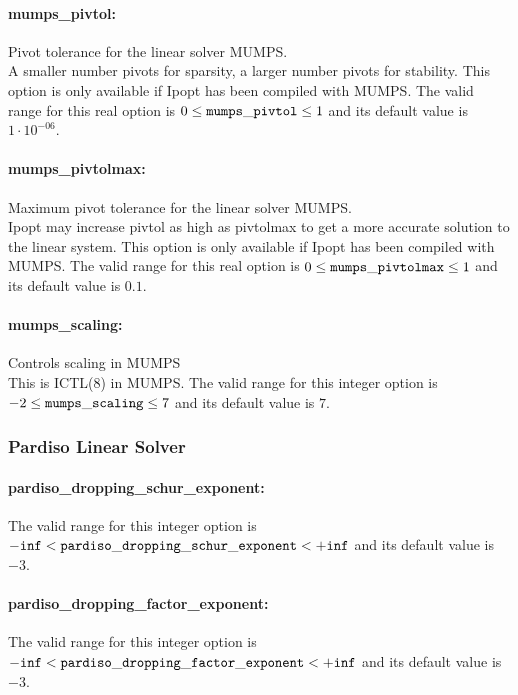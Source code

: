 \paragraph{mumps\_pivtol:}\label{sec:mumps_pivtol} Pivot tolerance for the linear solver MUMPS. $\;$ \\
 A smaller number pivots for sparsity, a larger
number pivots for stability.  This option is only
available if Ipopt has been compiled with MUMPS. The valid range for this real option is 
$0 \le {\tt mumps\_pivtol } \le 1$
and its default value is $1 \cdot 10^{-06}$.


\paragraph{mumps\_pivtolmax:}\label{sec:mumps_pivtolmax} Maximum pivot tolerance for the linear solver MUMPS. $\;$ \\
 Ipopt may increase pivtol as high as pivtolmax to
get a more accurate solution to the linear
system.  This option is only available if Ipopt
has been compiled with MUMPS. The valid range for this real option is 
$0 \le {\tt mumps\_pivtolmax } \le 1$
and its default value is $0.1$.


\paragraph{mumps\_scaling:}\label{sec:mumps_scaling} Controls scaling in MUMPS $\;$ \\
 This is ICTL(8) in MUMPS. The valid range for this integer option is
$-2 \le {\tt mumps\_scaling } \le 7$
and its default value is $7$.

\subsubsection{Pardiso Linear Solver}
\label{sec:Pardiso_Linear_Solver}

\paragraph{pardiso\_dropping\_schur\_exponent:}\label{sec:pardiso_dropping_schur_exponent}  $\;$ \\
 The valid range for this integer option is
${\tt -inf} <  {\tt pardiso\_dropping\_schur\_exponent } <  {\tt +inf}$
and its default value is $-3$.

\paragraph{pardiso\_dropping\_factor\_exponent:}\label{sec:pardiso_dropping_factor_exponent}  $\;$ \\
 The valid range for this integer option is
${\tt -inf} <  {\tt pardiso\_dropping\_factor\_exponent } <  {\tt +inf}$
and its default value is $-3$.

